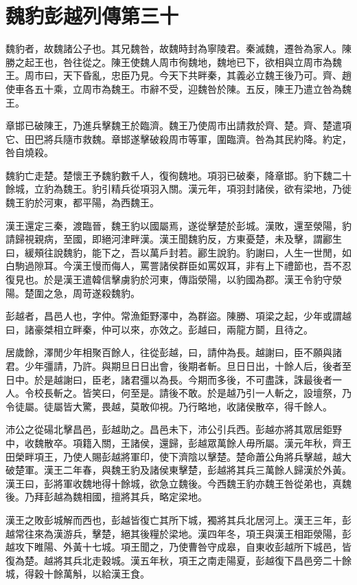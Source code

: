 \chapter{魏豹彭越列傳第三十}

魏豹者，故魏諸公子也。其兄魏咎，故魏時封為寧陵君。秦滅魏，遷咎為家人。陳勝之起王也，咎往從之。陳王使魏人周市徇魏地，魏地已下，欲相與立周市為魏王。周市曰，天下昏亂，忠臣乃見。今天下共畔秦，其義必立魏王後乃可。齊、趙使車各五十乘，立周市為魏王。市辭不受，迎魏咎於陳。五反，陳王乃遣立咎為魏王。

章邯已破陳王，乃進兵擊魏王於臨濟。魏王乃使周市出請救於齊、楚。齊、楚遣項它、田巴將兵隨市救魏。章邯遂擊破殺周市等軍，圍臨濟。咎為其民約降。約定，咎自燒殺。

魏豹亡走楚。楚懷王予魏豹數千人，復徇魏地。項羽已破秦，降章邯。豹下魏二十餘城，立豹為魏王。豹引精兵從項羽入關。漢元年，項羽封諸侯，欲有梁地，乃徙魏王豹於河東，都平陽，為西魏王。

漢王還定三秦，渡臨晉，魏王豹以國屬焉，遂從擊楚於彭城。漢敗，還至滎陽，豹請歸視親病，至國，即絕河津畔漢。漢王聞魏豹反，方東憂楚，未及擊，謂酈生曰，緩頰往說魏豹，能下之，吾以萬戶封若。酈生說豹。豹謝曰，人生一世閒，如白駒過隙耳。今漢王慢而侮人，罵詈諸侯群臣如罵奴耳，非有上下禮節也，吾不忍復見也。於是漢王遣韓信擊虜豹於河東，傳詣滎陽，以豹國為郡。漢王令豹守滎陽。楚圍之急，周苛遂殺魏豹。

彭越者，昌邑人也，字仲。常漁鉅野澤中，為群盜。陳勝、項梁之起，少年或謂越曰，諸豪桀相立畔秦，仲可以來，亦效之。彭越曰，兩龍方鬬，且待之。

居歲餘，澤閒少年相聚百餘人，往從彭越，曰，請仲為長。越謝曰，臣不願與諸君。少年彊請，乃許。與期旦日日出會，後期者斬。旦日日出，十餘人后，後者至日中。於是越謝曰，臣老，諸君彊以為長。今期而多後，不可盡誅，誅最後者一人。令校長斬之。皆笑曰，何至是。請後不敢。於是越乃引一人斬之，設壇祭，乃令徒屬。徒屬皆大驚，畏越，莫敢仰視。乃行略地，收諸侯散卒，得千餘人。

沛公之從碭北擊昌邑，彭越助之。昌邑未下，沛公引兵西。彭越亦將其眾居鉅野中，收魏散卒。項籍入關，王諸侯，還歸，彭越眾萬餘人毋所屬。漢元年秋，齊王田榮畔項王，乃使人賜彭越將軍印，使下濟陰以擊楚。楚命蕭公角將兵擊越，越大破楚軍。漢王二年春，與魏王豹及諸侯東擊楚，彭越將其兵三萬餘人歸漢於外黃。漢王曰，彭將軍收魏地得十餘城，欲急立魏後。今西魏王豹亦魏王咎從弟也，真魏後。乃拜彭越為魏相國，擅將其兵，略定梁地。

漢王之敗彭城解而西也，彭越皆復亡其所下城，獨將其兵北居河上。漢王三年，彭越常往來為漢游兵，擊楚，絕其後糧於梁地。漢四年冬，項王與漢王相距滎陽，彭越攻下睢陽、外黃十七城。項王聞之，乃使曹咎守成皋，自東收彭越所下城邑，皆復為楚。越將其兵北走穀城。漢五年秋，項王之南走陽夏，彭越復下昌邑旁二十餘城，得穀十餘萬斛，以給漢王食。


